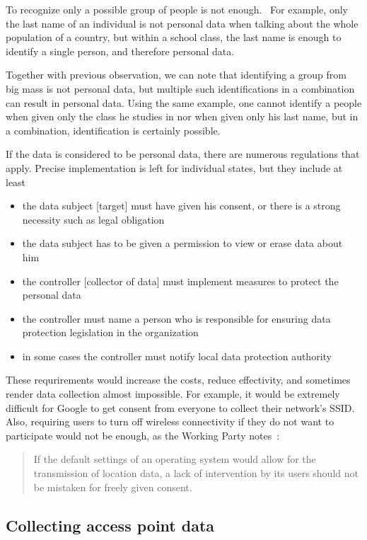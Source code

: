 \documentclass[12pt,a4paper,oneside,pdftex]{report}
\begin{document}
To recognize only a possible group of people is not enough.~\cite{wp29_136} For example, only the last name of an individual is not personal data when talking about the whole population of a country, but within a school class, the last name is enough to identify a single person, and therefore personal data.

Together with previous observation, we can note that identifying a group from big mass is not personal data, but multiple such identifications in a combination can result in personal data. Using the same example, one cannot identify a people when given only the class he studies in nor when given only his last name, but in a combination, identification is certainly possible.

If the data is considered to be personal data, there are numerous regulations that apply. Precise implementation is left for individual states, but they include at least
\begin{itemize}
    \item the data subject [target] must have given his consent, or there is a strong necessity such as legal obligation
    \item the data subject has to be given a permission to view or erase data about him
    \item the controller [collector of data] must implement measures to protect the personal data
    \item the controller must name a person who is responsible for ensuring data protection legislation in the organization
    \item in some cases the controller must notify local data protection authority
\end{itemize}

These requrirements would increase the costs, reduce effectivity, and sometimes render data collection almost impossible. For example, it would be extremely difficult for Google to get consent from everyone to collect their network's SSID. Also, requiring users to turn off wireless connectivity if they do not want to participate would not be enough, as the Working Party notes~\cite{wp29_185}:
\begin{quote}
    If the default settings of an operating system would allow for the transmission of location data, a lack of intervention by its users should not be mistaken for freely given consent.
\end{quote}


\subsection{Collecting access point data}
\label{subsec:eu_collect}
\end{document}
